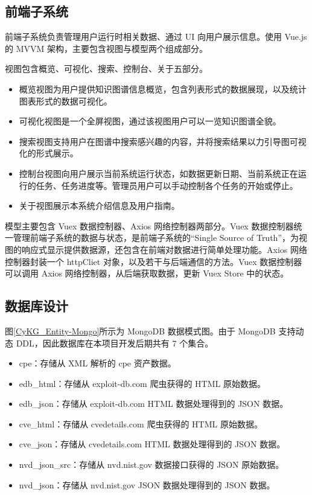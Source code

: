 \documentclass[a4paper,AutoFakeBold,oneside,12pt]{book}
\begin{document}
\subsection{前端子系统}

前端子系统负责管理用户运行时相关数据、通过 UI 向用户展示信息。使用 Vue.js 的 MVVM 架构，主要包含视图与模型两个组成部分。

视图包含概览、可视化、搜索、控制台、关于五部分。

\begin{itemize}
	\item 概览视图为用户提供知识图谱信息概览，包含列表形式的数据展现，以及统计图表形式的数据可视化。
	\item 可视化视图是一个全屏视图，通过该视图用户可以一览知识图谱全貌。
	\item 搜索视图支持用户在图谱中搜索感兴趣的内容，并将搜索结果以力引导图可视化的形式展示。
	\item 控制台视图向用户展示当前系统运行状态，如数据更新日期、当前系统正在运行的任务、任务进度等。管理员用户可以手动控制各个任务的开始或停止。
	\item 关于视图展示本系统介绍信息及用户指南。
\end{itemize}

模型主要包含 Vuex 数据控制器、Axios 网络控制器两部分。Vuex 数据控制器统一管理前端子系统的数据与状态，是前端子系统的“Single Source of Truth”，为视图的响应式显示提供数据源，还包含在前端对数据进行简单处理功能。Axios 网络控制器封装一个 httpCliet 对象，以及若干与后端通信的方法。Vuex 数据控制器可以调用 Axios 网络控制器，从后端获取数据，更新 Vuex Store 中的状态。

\subsection{数据库设计}

图\ref{CyKG_Entity-Mongo}所示为 MongoDB 数据模式图。由于 MongoDB 支持动态 DDL，因此数据库在本项目开发后期共有 7 个集合。
\begin{itemize}
	\item cpe：存储从 XML 解析的 cpe 资产数据。
	\item edb{\_}html：存储从 exploit-db.com 爬虫获得的 HTML 原始数据。
	\item edb{\_}json：存储从 exploit-db.com HTML 数据处理得到的 JSON 数据。
	\item cve{\_}html：存储从 cvedetails.com 爬虫获得的 HTML 原始数据。
	\item cve{\_}json：存储从 cvedetails.com HTML 数据处理得到的 JSON 数据。
	\item nvd{\_}json{\_}src：存储从 nvd.nist.gov 数据接口获得的 JSON 原始数据。
	\item nvd{\_}json：存储从 nvd.nist.gov JSON 数据处理得到的 JSON 数据。
\end{itemize}
\end{document}
